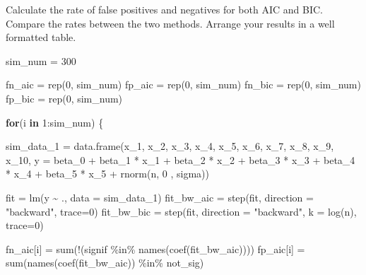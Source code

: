 \documentclass[
]{article}
\newenvironment{Shaded}{\begin{snugshade}}{\end{snugshade}}
\newcommand{\AttributeTok}[1]{\textcolor[rgb]{0.77,0.63,0.00}{#1}}
\newcommand{\ControlFlowTok}[1]{\textcolor[rgb]{0.13,0.29,0.53}{\textbf{#1}}}
\newcommand{\DecValTok}[1]{\textcolor[rgb]{0.00,0.00,0.81}{#1}}
\newcommand{\FunctionTok}[1]{\textcolor[rgb]{0.00,0.00,0.00}{#1}}
\newcommand{\NormalTok}[1]{#1}
\newcommand{\OtherTok}[1]{\textcolor[rgb]{0.56,0.35,0.01}{#1}}
\newcommand{\SpecialCharTok}[1]{\textcolor[rgb]{0.00,0.00,0.00}{#1}}
\newcommand{\StringTok}[1]{\textcolor[rgb]{0.31,0.60,0.02}{#1}}
\begin{document}
Calculate the rate of false positives and negatives for both AIC and
BIC. Compare the rates between the two methods. Arrange your results in
a well formatted table.

\begin{Shaded}
\begin{Highlighting}[]
\NormalTok{sim\_num }\OtherTok{=} \DecValTok{300}

\NormalTok{fn\_aic }\OtherTok{=} \FunctionTok{rep}\NormalTok{(}\DecValTok{0}\NormalTok{, sim\_num)}
\NormalTok{fp\_aic }\OtherTok{=} \FunctionTok{rep}\NormalTok{(}\DecValTok{0}\NormalTok{, sim\_num)}
\NormalTok{fn\_bic }\OtherTok{=} \FunctionTok{rep}\NormalTok{(}\DecValTok{0}\NormalTok{, sim\_num)}
\NormalTok{fp\_bic }\OtherTok{=} \FunctionTok{rep}\NormalTok{(}\DecValTok{0}\NormalTok{, sim\_num)}

\ControlFlowTok{for}\NormalTok{(i }\ControlFlowTok{in} \DecValTok{1}\SpecialCharTok{:}\NormalTok{sim\_num) \{}
  
\NormalTok{  sim\_data\_1 }\OtherTok{=} \FunctionTok{data.frame}\NormalTok{(x\_1, x\_2, x\_3, x\_4, x\_5, x\_6, x\_7, x\_8, x\_9, x\_10,}
    \AttributeTok{y =}\NormalTok{ beta\_0 }\SpecialCharTok{+}\NormalTok{ beta\_1 }\SpecialCharTok{*}\NormalTok{ x\_1 }\SpecialCharTok{+}\NormalTok{ beta\_2 }\SpecialCharTok{*}\NormalTok{ x\_2 }\SpecialCharTok{+}\NormalTok{ beta\_3 }\SpecialCharTok{*}\NormalTok{ x\_3 }\SpecialCharTok{+}\NormalTok{ beta\_4 }\SpecialCharTok{*}\NormalTok{ x\_4 }\SpecialCharTok{+} 
\NormalTok{        beta\_5 }\SpecialCharTok{*}\NormalTok{ x\_5 }\SpecialCharTok{+} \FunctionTok{rnorm}\NormalTok{(n, }\DecValTok{0}\NormalTok{ , sigma))}
  
\NormalTok{  fit }\OtherTok{=} \FunctionTok{lm}\NormalTok{(y }\SpecialCharTok{\textasciitilde{}}\NormalTok{ ., }\AttributeTok{data =}\NormalTok{ sim\_data\_1)}
\NormalTok{  fit\_bw\_aic }\OtherTok{=} \FunctionTok{step}\NormalTok{(fit, }\AttributeTok{direction =} \StringTok{"backward"}\NormalTok{, }\AttributeTok{trace=}\DecValTok{0}\NormalTok{)}
\NormalTok{  fit\_bw\_bic }\OtherTok{=} \FunctionTok{step}\NormalTok{(fit, }\AttributeTok{direction =} \StringTok{"backward"}\NormalTok{, }\AttributeTok{k =} \FunctionTok{log}\NormalTok{(n), }\AttributeTok{trace=}\DecValTok{0}\NormalTok{)}
  
\NormalTok{  fn\_aic[i] }\OtherTok{=} \FunctionTok{sum}\NormalTok{(}\SpecialCharTok{!}\NormalTok{(signif }\SpecialCharTok{\%in\%} \FunctionTok{names}\NormalTok{(}\FunctionTok{coef}\NormalTok{(fit\_bw\_aic))))}
\NormalTok{  fp\_aic[i] }\OtherTok{=} \FunctionTok{sum}\NormalTok{(}\FunctionTok{names}\NormalTok{(}\FunctionTok{coef}\NormalTok{(fit\_bw\_aic)) }\SpecialCharTok{\%in\%}\NormalTok{ not\_sig)}
  

\end{Highlighting}
\end{Shaded}
\end{document}
